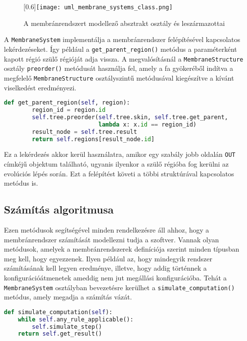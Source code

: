\begin{figure}[H]
\centering
\advance\leftskip-3.5cm
	\scalebox{0.6}[0.6]{\texttt{[image: uml\_membrane\_systems\_class.png]}}
	\caption{A membránrendszert modellező absztrakt osztály és leszármazottai}
	\label{fig:system_uml}
\end{figure}

A \verb|MembraneSystem| implementálja a membránrendszer felépítésével kapcsolatos lekérdezéseket. Így például a \verb|get_parent_region()| metódus a paraméterként kapott régió szülő régióját adja vissza. 
A megvalósításnál a \verb|MembraneStructure| osztály \verb|preorder()| metódusát használja fel, amely a fa gyökeréből indítva a megfelelő \verb|MembraneStructure| osztályszintű metódusával kiegészítve a kívánt viselkedést eredményezi.

\newpage

\begin{lstlisting}[language={Python}]
def get_parent_region(self, region):
        region_id = region.id
        self.tree.preorder(self.tree.skin, self.tree.get_parent,
                           lambda x: x.id == region_id)
        result_node = self.tree.result
        return self.regions[result_node.id]
\end{lstlisting}


Ez a lekérdezés akkor kerül használatra, amikor egy szabály jobb oldalán  \verb|OUT| címkéjű objektum található, ugyanis ilyenkor a szülő régióba fog kerülni az evolúciós lépés során. Ezt a felépítést követi a többi struktúrával kapcsolatos metódus is.

\subsection{Számítás algoritmusa}

Ezen metódusok segítségével minden rendelkezésre áll ahhoz, hogy a membránrendszer számítását modellezni tudja a szoftver. Vannak olyan metódusok, amelyek a membránrendszerek definíciója szerint minden típusban meg kell, hogy egyezzenek. Ilyen például az, hogy mindegyik rendszer számításának kell legyen eredménye, illetve, hogy addig történnek a konfigurációátmenetek ameddig nem jut megállási konfigurációba. Tehát a \verb|MembraneSystem| osztályban bevezetésre kerülhet a \verb|simulate_computation()| metódus, amely megadja a számítás vázát. 

\begin{lstlisting}[language={Python}]
def simulate_computation(self):
	while self.any_rule_applicable():
     	self.simulate_step()
	return self.get_result()
\end{lstlisting}

